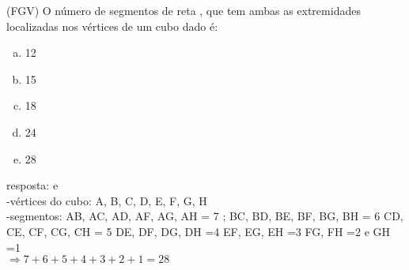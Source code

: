 \begin{ex}
 (FGV) O número de segmentos de reta ,     que tem ambas as extremidades localizadas nos vértices de um cubo dado é:
    \begin{enumerate}[(a)]
    \item 12
    \item 15
    \item 18
    \item 24
    \item 28
    \end{enumerate}
      \begin{sol}
      resposta: e \\
        -vértices do cubo: A, B, C, D, E, F, G, H \\
        -segmentos: AB, AC, AD, AF, AG, AH = 7 ;\hspace{0,25cm} BC, BD, BE, BF, BG, BH = 6 \hspace{0,25cm} CD, CE, CF, CG, CH = 5 \hspace{0.25cm} DE, DF, DG, DH =4 \hspace{0,25cm} EF, EG, EH =3 \hspace{0,25cm} FG, FH =2  e  GH =1  \\ $\Longrightarrow 7 + 6 + 5 + 4 + 3 +2 +1 =28$
      \end{sol}
\end{ex}